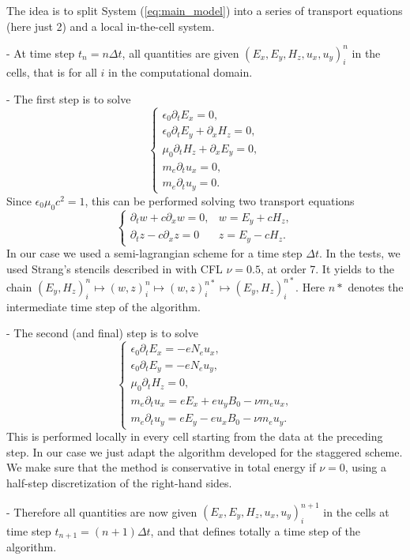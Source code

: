 The idea is to split 
System (\ref{eq:main_model})
into a series of  transport equations (here just 2) and a local in-the-cell system. 

- At time step $t_n=n\Delta t$, all quantities are given $(E_x,E_y, H_z, u_x,u_y)_{i}^n$ in the cells, that is for all $i$ in the 
computational domain.

- The first step is to solve 
$$
\left\{
\begin{array}{lll}
\epsilon_0\partial_t E_{x}=0,\\
\epsilon_0\partial_t E_{y}+\partial_x H_z=0,\\
\mu_0\partial_t H_z+\partial_x E_y=0,\\
m_e\partial_t u_x=0,\\
m_e\partial_t u_y=0.
\end{array}
\right.
$$
Since  $\epsilon_0 \mu_0c^2=1$, this can be  performed solving
two transport equations 
$$
\left\{
\begin{array}{lll}
\partial_t w +c \partial_x w=0, & w=E_{y}+ c H_z,  \\
\partial_t z -c \partial_x z=0& z=E_{y}-  c H_z.
\end{array}
\right.
$$
In our case we used 
a semi-lagrangian scheme for a time step $\Delta t$.
In the tests, we used Strang's stencils described in \cite{cedar} with CFL $\nu=0.5$, at order 7. 
It  yields to the chain 
$(E_y,H_z)_i^n\mapsto ( w,z)_i^n\mapsto ( w,z)_i^{n*}\mapsto (E_y,H_z)_i^{n*} $.
Here $n*$ denotes the intermediate time step of the algorithm.

- The second (and final) step is to solve
$$
\left\{\begin{array}{l}
\epsilon_0\partial_t E_{x}=-eN_e u_x,\\
\epsilon_0\partial_t E_{y}=-eN_e u_y,\\
\mu_0\partial_t H_z=0,\\
m_e\partial_t u_x=eE_x+eu_yB_0-\nu m_e u_x,\\
m_e\partial_t u_y=eE_y-eu_xB_0-\nu m_e u_y.
\end{array}
\right.$$
This is performed locally in every cell starting from the data at the preceding 
step. In our case we just adapt the algorithm developed for the staggered scheme.
We make sure that the method is conservative in total energy if $\nu=0$, using a half-step discretization
of the right-hand sides.

- Therefore  all quantities are now given $(E_x,E_y, H_z, u_x,u_y)_{i}^{n+1}$ in the cells 
at time step $t_{n+1}=(n+1)\Delta t$, and that defines totally a time step of the algorithm.


